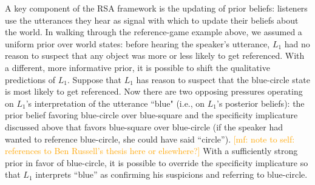 \documentclass{sp}
\newcommand{\gcs}[1]{\textcolor{blue}{[gcs: #1]}}
\newcommand{\mf}[1]{\textcolor{orange}{[mf: #1]}}
\newcommand{\mht}[1]{\textcolor{purple}{[mht: #1]}}
\begin{document}
A key component of the RSA framework is the updating of prior beliefs: listeners use the utterances they hear as signal with which to update their beliefs about the world. In walking through the reference-game example above, we assumed a uniform prior over world states: before hearing the speaker's utterance, $L_1$ had no reason to suspect that any object was more or less likely to get referenced. With a different, more informative prior, it is possible to shift the qualitative predictions of $L_1$. Suppose that $L_1$ has reason to suspect that the blue-circle state is most likely to get referenced. Now there are two opposing pressures operating on $L_1$'s interpretation of the utterance ``blue" (i.e., on $L_1$'s posterior beliefs): the prior belief favoring blue-circle over blue-square and the specificity implicature discussed above that favors blue-square over blue-circle (if the speaker had wanted to reference blue-circle, she could have said ``circle''). \mf{note to self: references to Ben Russell's thesis here or elsewhere?} With a sufficiently strong prior in favor of blue-circle, it is possible to override the specificity implicature so that $L_1$ interprets ``blue'' as confirming his suspicions and referring to blue-circle.
\end{document}
